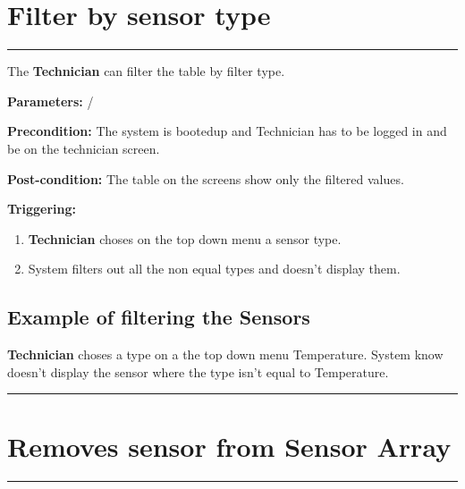 \section{Filter by sensor type}

\hrule
\hfill
\vspace{0.5cm}

\label{operation:filterSensorTable}

The \textbf{Technician} can filter the table by filter type.
\begin{description}

\item \textbf{Parameters:} /
\item \textbf{Precondition:} The system is bootedup and Technician has to be
logged in and be on the technician screen.
\item \textbf{Post-condition:} The table on the screens show only the filtered
values.

\item \textbf{Triggering:}
\begin{enumerate}
\item \textbf{Technician} choses on the top down menu a sensor type.
\item System filters out all the non equal types and doesn't display them.
\end{enumerate}
\end{description}

\subsection{Example of filtering the Sensors}
\textbf{Technician} choses a type on a the top down menu Temperature. System
know doesn't display the sensor where the type isn't equal to Temperature.
\hfill
\vspace{0.5cm}
\hrule






\section{Removes sensor from Sensor Array}

\hrule
\hfill
\vspace{0.5cm}

\label{operation:removesSensor}

